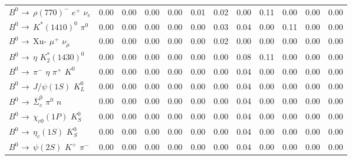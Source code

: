 {\begin{tabular}{lrrrrrrrrrrr}
$B^{0}$ $\rightarrow$ $\rho(770)^{-}$ $e^{+}$ $\nu_{e}$         &         0.00 &         0.00 &         0.00 &         0.00 &         0.01 &         0.02 &         0.00 &         0.11 &         0.00 &         0.00 &         0.00 \\
$B^{0}$ $\rightarrow$ $K^{*}(1410)^{0}$ $\pi^{0}$               &         0.00 &         0.00 &         0.00 &         0.00 &         0.00 &         0.03 &         0.04 &         0.00 &         0.11 &         0.00 &         0.00 \\
$B^{0}$ $\rightarrow$ Xu- $\mu^{+}$ $\nu_{\mu}$                 &         0.00 &         0.00 &         0.00 &         0.00 &         0.00 &         0.02 &         0.00 &         0.00 &         0.00 &         0.00 &         0.00 \\
$B^{0}$ $\rightarrow$ $\eta$ $K_{2}^{*}(1430)^{0}$              &         0.00 &         0.00 &         0.00 &         0.00 &         0.00 &         0.00 &         0.08 &         0.11 &         0.00 &         0.00 &         0.00 \\
$B^{0}$ $\rightarrow$ $\pi^{-}$ $\eta$ $\pi^{+}$ $K^{0}$        &         0.00 &         0.00 &         0.00 &         0.00 &         0.00 &         0.00 &         0.04 &         0.00 &         0.00 &         0.00 &         0.00 \\
$B^{0}$ $\rightarrow$ $J/\psi(1S)$ $K_{L}^{0}$                  &         0.00 &         0.00 &         0.00 &         0.00 &         0.00 &         0.00 &         0.04 &         0.00 &         0.00 &         0.00 &         0.00 \\
$B^{0}$ $\rightarrow$ $\overline{\Sigma}_{c}^{0}$ $\pi^{0}$ $n$ &         0.00 &         0.00 &         0.00 &         0.00 &         0.00 &         0.00 &         0.04 &         0.00 &         0.00 &         0.00 &         0.00 \\
$B^{0}$ $\rightarrow$ $\chi_{c0}(1P)$ $K_{S}^{0}$               &         0.00 &         0.00 &         0.00 &         0.00 &         0.00 &         0.00 &         0.04 &         0.00 &         0.00 &         0.00 &         0.00 \\
$B^{0}$ $\rightarrow$ $\eta_{c}(1S)$ $K_{S}^{0}$                &         0.00 &         0.00 &         0.00 &         0.00 &         0.00 &         0.00 &         0.04 &         0.00 &         0.00 &         0.00 &         0.00 \\
$B^{0}$ $\rightarrow$ $\psi(2S)$ $K^{+}$ $\pi^{-}$              &         0.00 &         0.00 &         0.00 &         0.00 &         0.00 &         0.00 &         0.04 &         0.00 &         0.00 &         0.00 &         0.00 \\

\end{tabular}}
